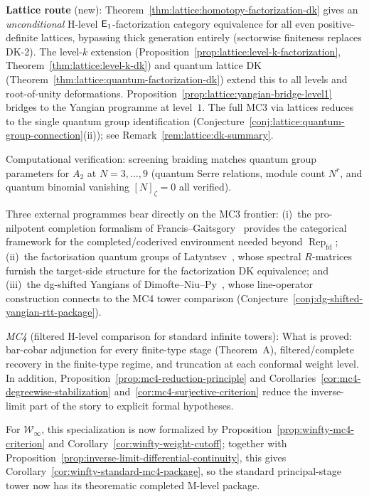 \begin{remark}
\textbf{Lattice route} (new):
Theorem~\ref{thm:lattice:homotopy-factorization-dk} gives an
\emph{unconditional} H-level $\mathsf{E}_1$-factorization category
equivalence for all even positive-definite lattices, bypassing
thick generation entirely (sectorwise finiteness replaces DK-2).
The level-$k$ extension
(Proposition~\ref{prop:lattice:level-k-factorization},
Theorem~\ref{thm:lattice:level-k-dk}) and quantum lattice DK
(Theorem~\ref{thm:lattice:quantum-factorization-dk}) extend this
to all levels and root-of-unity deformations.
Proposition~\ref{prop:lattice:yangian-bridge-level1} bridges to
the Yangian programme at level~$1$.  The full MC3 via lattices
reduces to the single quantum group identification
(Conjecture~\ref{conj:lattice:quantum-group-connection}(ii));
see Remark~\ref{rem:lattice:dk-summary}.

Computational verification: screening braiding matches quantum group
parameters for $A_2$ at $N = 3, \ldots, 9$ (quantum Serre relations,
module count $N^r$, and quantum binomial vanishing $[N]_\zeta = 0$
all verified).

Three external programmes bear directly on the MC3 frontier:
(i)~the pro-nilpotent completion formalism of
Francis--Gaitsgory~\cite{FG12} provides the categorical framework for
the completed/coderived environment needed beyond
$\operatorname{Rep}_{\mathrm{fd}}$;
(ii)~the factorisation quantum groups of
Latyntsev~\cite{Latyntsev23}, whose spectral $R$-matrices furnish the
target-side structure for the factorization DK equivalence; and
(iii)~the dg-shifted Yangians of
Dimofte--Niu--Py~\cite{DNP25}, whose line-operator construction
connects to the MC4 tower comparison
(Conjecture~\ref{conj:dg-shifted-yangian-rtt-package}).

\emph{MC4} (filtered H-level comparison for standard infinite towers):
What is proved: bar-cobar adjunction for every finite-type stage
(Theorem~A), filtered/complete recovery in the finite-type regime, and
truncation at each conformal weight level.  In addition,
Proposition~\ref{prop:mc4-reduction-principle} and
Corollaries~\ref{cor:mc4-degreewise-stabilization}
and~\ref{cor:mc4-surjective-criterion} reduce the inverse-limit part of
the story to explicit formal hypotheses.

For $\mathcal{W}_\infty$, this specialization is now formalized by
Proposition~\ref{prop:winfty-mc4-criterion} and
Corollary~\ref{cor:winfty-weight-cutoff}; together with
Proposition~\ref{prop:inverse-limit-differential-continuity}, this
gives Corollary~\ref{cor:winfty-standard-mc4-package}, so the standard
principal-stage tower now has its theorematic completed M-level
package.


\end{remark}
